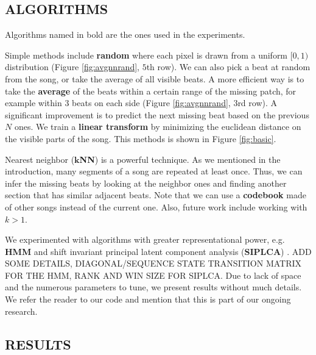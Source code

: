 \documentclass{article}
\begin{document}
\subsection{ALGORITHMS}
\label{ssec:algo}
Algorithms named in bold are the ones used in the experiments.

Simple methods include \textbf{random} where each pixel is drawn from a uniform $[0,1)$
distribution (Figure \ref{fig:avgnnrand}, $5$th row). 
We can also pick a beat at random from the song, or take the average
of all visible beats. A more efficient way is to take the \textbf{average} of the beats
within a certain range of the missing patch, for example within $3$ beats on each
side (Figure \ref{fig:avgnnrand}, $3$rd row).
A significant improvement is to predict the next missing beat based on the
previous $N$ ones. We train a \textbf{linear transform} by minimizing the euclidean distance
on the visible parts of the song. This methods is shown in Figure \ref{fig:basic}.

Nearest neighbor ($\mathbf{k}$\textbf{NN}) is a powerful technique. 
As we mentioned in the introduction, many segments
of a song are repeated at least once. Thus, we can infer the missing beats by looking at
the neighbor ones and finding another section that has similar adjacent beats. Note
that we can use a \textbf{codebook} made of other songs instead of the current one. Also, future
work include working with $k > 1$.

We experimented with algorithms with greater representational power, e.g. \textbf{HMM} and
shift invariant principal latent component analysis (\textbf{SIPLCA}) \cite{Weiss2010}.
ADD SOME DETAILS, DIAGONAL/SEQUENCE STATE TRANSITION MATRIX FOR THE HMM, 
RANK AND WIN SIZE FOR SIPLCA.
Due to lack of space and the numerous parameters to tune, we present results without
much details. We refer the reader to our code and mention that this is part of our
ongoing research.


\subsection{RESULTS}
\label{ssec:results}
\end{document}
